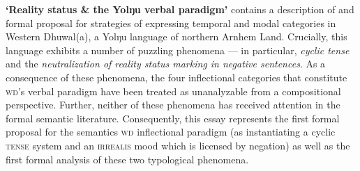 {\textbf{‘Reality status \& the Yolŋu verbal paradigm’} contains a description of and formal proposal for strategies of expressing temporal and modal categories in Western Dhuwal(a), a Yolŋu language of northern Arnhem Land. Crucially, this language exhibits a number of puzzling phenomena --- in particular, \textit{cyclic tense} and the \textit{neutralization of reality status marking in negative sentences}. As a consequence of these phenomena, the four inflectional categories that constitute \textsc{wd}'s verbal paradigm have been treated as unanalyzable from a compositional perspective. Further, neither of these phenomena has received attention in the formal semantic literature. Consequently, this essay represents the first formal proposal for the semantics \textsc{wd} inflectional paradigm (as instantiating a cyclic \textsc{tense} system and an \textsc{irrealis} mood which is licensed by negation) as well as the first formal analysis of these two typological phenomena.


}

\pagebreak